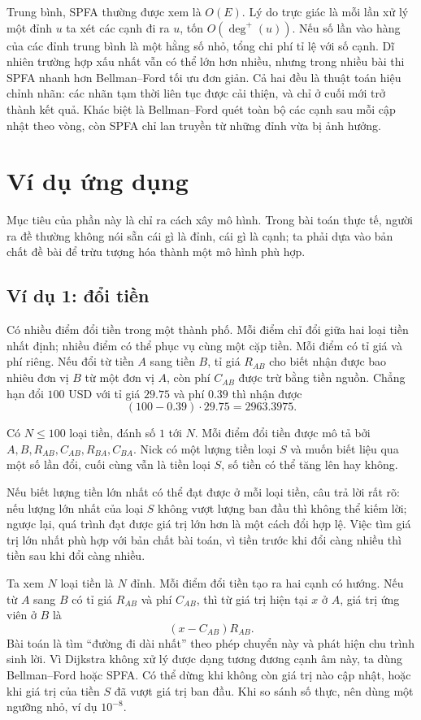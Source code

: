 \documentclass[11pt]{article}
\begin{document}
Trung bình, SPFA thường được xem là \(O(E)\). Lý do trực giác là mỗi lần xử lý
một đỉnh \(u\) ta xét các cạnh đi ra \(u\), tốn \(O(\deg^+(u))\). Nếu số lần
vào hàng của các đỉnh trung bình là một hằng số nhỏ, tổng chi phí tỉ lệ với số
cạnh. Dĩ nhiên trường hợp xấu nhất vẫn có thể lớn hơn nhiều, nhưng trong nhiều
bài thi SPFA nhanh hơn Bellman--Ford tối ưu đơn giản. Cả hai đều là thuật toán
hiệu chỉnh nhãn: các nhãn tạm thời liên tục được cải thiện, và chỉ ở cuối mới
trở thành kết quả. Khác biệt là Bellman--Ford quét toàn bộ các cạnh sau mỗi
cập nhật theo vòng, còn SPFA chỉ lan truyền từ những đỉnh vừa bị ảnh hưởng.

\section{Ví dụ ứng dụng}

Mục tiêu của phần này là chỉ ra cách xây mô hình. Trong bài toán thực tế,
người ra đề thường không nói sẵn cái gì là đỉnh, cái gì là cạnh; ta phải dựa
vào bản chất đề bài để trừu tượng hóa thành một mô hình phù hợp.

\subsection{Ví dụ 1: đổi tiền}

Có nhiều điểm đổi tiền trong một thành phố. Mỗi điểm chỉ đổi giữa hai loại
tiền nhất định; nhiều điểm có thể phục vụ cùng một cặp tiền. Mỗi điểm có tỉ
giá và phí riêng. Nếu đổi từ tiền \(A\) sang tiền \(B\), tỉ giá \(R_{AB}\) cho
biết nhận được bao nhiêu đơn vị \(B\) từ một đơn vị \(A\), còn phí
\(C_{AB}\) được trừ bằng tiền nguồn. Chẳng hạn đổi \(100\) USD với tỉ giá
\(29.75\) và phí \(0.39\) thì nhận được
\[
  (100-0.39)\cdot 29.75=2963.3975.
\]

Có \(N\le 100\) loại tiền, đánh số \(1\) tới \(N\). Mỗi điểm đổi tiền được mô
tả bởi \(A,B,R_{AB},C_{AB},R_{BA},C_{BA}\). Nick có một lượng tiền loại \(S\)
và muốn biết liệu qua một số lần đổi, cuối cùng vẫn là tiền loại \(S\), số
tiền có thể tăng lên hay không.

Nếu biết lượng tiền lớn nhất có thể đạt được ở mỗi loại tiền, câu trả lời rất
rõ: nếu lượng lớn nhất của loại \(S\) không vượt lượng ban đầu thì không thể
kiếm lời; ngược lại, quá trình đạt được giá trị lớn hơn là một cách đổi hợp
lệ. Việc tìm giá trị lớn nhất phù hợp với bản chất bài toán, vì tiền trước
khi đổi càng nhiều thì tiền sau khi đổi càng nhiều.

Ta xem \(N\) loại tiền là \(N\) đỉnh. Mỗi điểm đổi tiền tạo ra hai cạnh có
hướng. Nếu từ \(A\) sang \(B\) có tỉ giá \(R_{AB}\) và phí \(C_{AB}\), thì từ
giá trị hiện tại \(x\) ở \(A\), giá trị ứng viên ở \(B\) là
\[
  (x-C_{AB})R_{AB}.
\]
Bài toán là tìm ``đường đi dài nhất'' theo phép chuyển này và phát hiện chu
trình sinh lời. Vì Dijkstra không xử lý được dạng tương đương cạnh âm này, ta
dùng Bellman--Ford hoặc SPFA. Có thể dừng khi không còn giá trị nào cập nhật,
hoặc khi giá trị của tiền \(S\) đã vượt giá trị ban đầu. Khi so sánh số thực,
nên dùng một ngưỡng nhỏ, ví dụ \(10^{-8}\).
\end{document}
